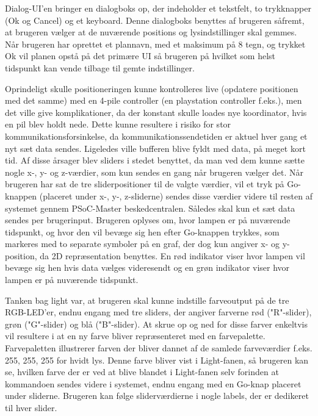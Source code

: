 Dialog-UI'en bringer en dialogboks op, der indeholder et tekstfelt, to trykknapper (Ok og Cancel) og et keyboard. Denne dialogboks benyttes af brugeren såfremt, at brugeren vælger at de nuværende positions og lysindstillinger skal gemmes. Når brugeren har oprettet et plannavn, med et maksimum på 8 tegn, og trykket Ok vil planen opstå på det primære UI så brugeren på hvilket som helst tidspunkt kan vende tilbage til gemte indstillinger.
\newline

Oprindeligt skulle positioneringen kunne kontrolleres live (opdatere positionen med det samme) med en 4-pile controller (en playstation controller f.eks.), men det ville give komplikationer, da der konstant skulle loades nye koordinator, hvis en pil blev holdt nede. Dette kunne resultere i risiko for stor kommunikationsforsinkelse, da kommunikationssendetiden er aktuel hver gang et nyt sæt data sendes. Ligeledes ville bufferen blive fyldt med data, på meget kort tid. Af disse årsager blev sliders i stedet benyttet, da man ved dem kunne sætte nogle x-, y- og z-værdier, som kun sendes en gang når brugeren vælger det. Når brugeren har sat de tre sliderpositioner til de valgte værdier, vil et tryk på Go-knappen (placeret under x-, y-, z-sliderne) sendes disse værdier videre til resten af systemet gennem PSoC-Master beskedcentralen. Således skal kun et sæt data sendes per brugerinput. Brugeren oplyses om, hvor lampen er på nuværende tidspunkt, og hvor den vil bevæge sig hen efter Go-knappen trykkes, som markeres med to separate symboler på en graf, der dog kun angiver x- og y-position, da 2D repræsentation benyttes. En rød indikator viser hvor lampen vil bevæge sig hen hvis data vælges videresendt og en grøn indikator viser hvor lampen er på nuværende tidspunkt.
\newline

Tanken bag light var, at brugeren skal kunne indstille farveoutput på de tre RGB-LED’er, endnu engang med tre sliders, der angiver farverne rød ("R"-slider), grøn ("G"-slider) og blå ("B"-slider). At skrue op og ned for disse farver enkeltvis vil resultere i at en ny farve bliver repræsenteret med en farvepalette. Farvepaletten illustrerer farven der bliver dannet af de samlede farveværdier f.eks. 255, 255, 255 for hvidt lys. Denne farve bliver vist i Light-fanen, så brugeren kan se, hvilken farve der er ved at blive blandet i Light-fanen selv forinden at kommandoen sendes videre i systemet, endnu engang med en Go-knap placeret under sliderne. Brugeren kan følge sliderværdierne i nogle labels, der er dedikeret til hver slider.
\newline

